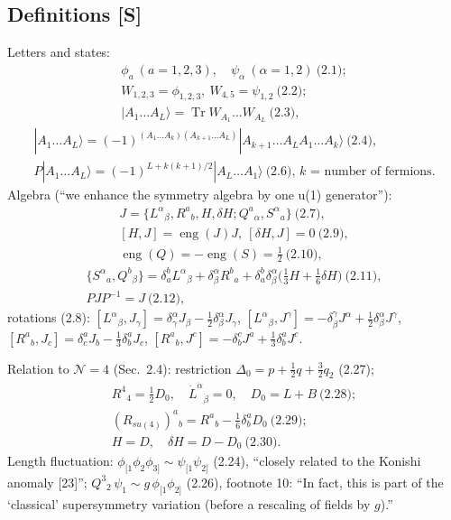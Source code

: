 \documentclass[10pt]{article}
\begin{document}
\subsection{Definitions [S]}
Letters and states:
\begin{gather*}
\phi_a\ (a=1,2,3),\quad \psi_\alpha\ (\alpha=1,2)\ \text{(2.1)};\\ W_{1,2,3}=\phi_{1,2,3},\ W_{4,5}=\psi_{1,2}\ \text{(2.2)};\\ |A_1\dots A_L\rangle=\operatorname{Tr}W_{A_1}\dots W_{A_L}\ \text{(2.3)},
\end{gather*}
\begin{gather*}
|A_1\dots A_L\rangle=(-1)^{(A_1\dots A_k)(A_{k+1}\dots A_L)}|A_{k+1}\dots A_LA_1\dots A_k\rangle\ \text{(2.4)},\\
P|A_1\dots A_L\rangle=(-1)^{L+k(k+1)/2}|A_L\dots A_1\rangle\ \text{(2.6), $k$ = number of fermions}.
\end{gather*}
Algebra (``we enhance the symmetry algebra by one u(1) generator''):
\begin{gather*}
J=\{L^\alpha{}_\beta,R^a{}_b,H,\delta H;Q^a{}_\alpha,S^\alpha{}_a\}\ \text{(2.7)},\\ [H,J]=\operatorname{eng}(J)J,\ [\delta H,J]=0\ \text{(2.9)},\\ \operatorname{eng}(Q)=-\operatorname{eng}(S)=\tfrac12\ \text{(2.10)},
\end{gather*}
\begin{gather*}
\{S^\alpha{}_a,Q^b{}_\beta\}=\delta^b_aL^\alpha{}_\beta+\delta^\alpha_\beta R^b{}_a+\delta^b_a\delta^\alpha_\beta\big(\tfrac13H+\tfrac16\delta H\big)\ \text{(2.11)},\\ PJP^{-1}=J\ \text{(2.12)},
\end{gather*}
rotations (2.8): $[L^\alpha{}_\beta,J_\gamma]=\delta^\alpha_\gamma J_\beta-\tfrac12\delta^\alpha_\beta J_\gamma$, $[L^\alpha{}_\beta,J^\gamma]=-\delta^\gamma_\beta J^\alpha+\tfrac12\delta^\alpha_\beta J^\gamma$, $[R^a{}_b,J_c]=\delta^a_cJ_b-\tfrac13\delta^a_bJ_c$, $[R^a{}_b,J^c]=-\delta^c_bJ^a+\tfrac13\delta^a_bJ^c$.

Relation to $\mathcal N=4$ (Sec.\ 2.4): restriction $\Delta_0=p+\tfrac12q+\tfrac32q_2$ (2.27);
\begin{gather*}
R^4{}_4=\tfrac12D_0,\quad \dot L^{\dot\alpha}{}_{\dot\beta}=0,\quad D_0=L+B\ \text{(2.28)};\\ (R_{su(4)})^a{}_b=R^a{}_b-\tfrac16\delta^a_bD_0\ \text{(2.29)};\\ H=D,\quad \delta H=D-D_0\ \text{(2.30)}.
\end{gather*}
Length fluctuation: $\phi_{[1}\phi_2\phi_{3]}\sim\psi_{[1}\psi_{2]}$ (2.24), ``closely related to the Konishi anomaly [23]''; $Q^3{}_2\,\psi_1\sim g\,\phi_{[1}\phi_{2]}$ (2.26), footnote 10: ``In fact, this is part of the `classical' supersymmetry variation (before a rescaling of fields by $g$).''
\end{document}
